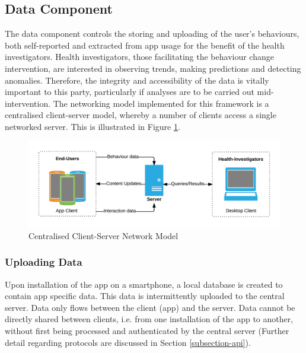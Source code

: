 \subsection{Data Component}
The data component controls the storing and uploading of the user's behaviours, both self-reported and extracted from app usage for the benefit of the health investigators. Health investigators, those facilitating the behaviour change intervention, are interested in observing trends, making predictions and detecting anomalies. Therefore, the integrity and accessibility of the data is vitally important to this party, particularly if analyses are to be carried out mid-intervention. The networking model implemented for this framework is a centralised client-server model, whereby a number of clients access a single networked server. This is illustrated in Figure \ref{fig: clientserver-model}.

\begin{figure}[h]
    \centering
    \includegraphics[scale=0.9, angle=0]{Files/prevention-study-1/figures/client-server}
    \caption{Centralised Client-Server Network Model}
    \label{fig: clientserver-model}
\end{figure}

\subsubsection{Uploading Data}
Upon installation of the app on a smartphone, a local database is created to contain app specific data. This data is intermittently uploaded to the central server. Data only flows between the client (app) and the server. Data cannot be directly shared between clients, i.e. from one installation of the app to another, without first being processed and authenticated by the central server (Further detail regarding protocols are discussed in Section \ref{subsection-api}).

